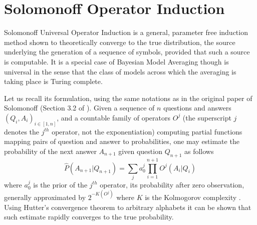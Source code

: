 \documentclass[runningheads]{llncs}
\begin{document}



\section{Solomonoff Operator Induction}
\label{sol-op-ind}
Solomonoff Universal Operator Induction \cite{Solomonoff08Three} is a
general, parameter free induction method shown to theoretically
converge to the true distribution, the source underlying the
generation of a sequence of symbols, provided that such a source is
computable. It is a special case of Bayesian Model Averaging
\cite{Hoeting99bayesianmodel} though is universal in the sense that
the class of models across which the averaging is taking place is
Turing complete.

Let us recall its formulation, using the same notations as in the
original paper of Solomonoff (Section 3.2 of
\cite{Solomonoff08Three}). Given a sequence of $n$ questions and
answers $(Q_i, A_i)_{i \in [1, n]}$, and a countable family of
operators $O^j$ (the superscript $j$ denotes the $j^{th}$ operator,
not the exponentiation) computing partial functions mapping pairs of
question and answer to probabilities, one may estimate the probability
of the next answer $A_{n+1}$ given question $Q_{n+1}$ as follows
\begin{equation}
  \label{sol}
  \hat{P}(A_{n+1}|Q_{n+1}) = \sum_j a_0^j \prod_{i=1}^{n+1} O^j(A_i|Q_i)
\end{equation}
where $a_0^j$ is the prior of the $j^{th}$ operator, its probability
after zero observation, generally approximated by $2^{-K(O^j)}$ where
$K$ is the Kolmogorov complexity \cite{Li97anintroduction}. Using
Hutter's convergence theorem to arbitrary alphabets
\cite{Hutter03Optimality} it can be shown that such estimate rapidly
converges to the true probability.
\end{document}
